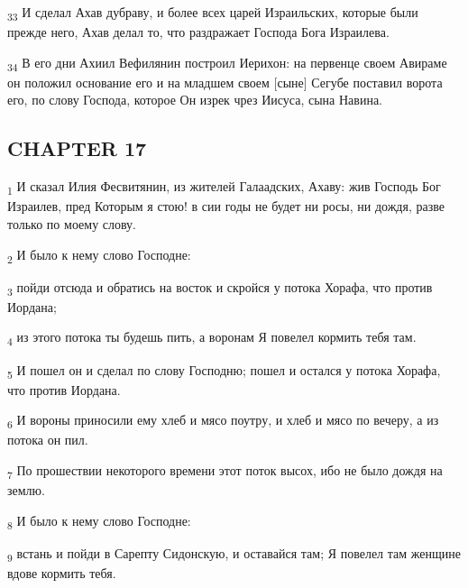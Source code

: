 \begin{tcolorbox}
\textsubscript{33} И сделал Ахав дубраву, и более всех царей Израильских, которые были прежде него, Ахав делал то, что раздражает Господа Бога Израилева.
\end{tcolorbox}
\begin{tcolorbox}
\textsubscript{34} В его дни Ахиил Вефилянин построил Иерихон: на первенце своем Авираме он положил основание его и на младшем своем [сыне] Сегубе поставил ворота его, по слову Господа, которое Он изрек чрез Иисуса, сына Навина.
\end{tcolorbox}
\subsection{CHAPTER 17}
\begin{tcolorbox}
\textsubscript{1} И сказал Илия Фесвитянин, из жителей Галаадских, Ахаву: жив Господь Бог Израилев, пред Которым я стою! в сии годы не будет ни росы, ни дождя, разве только по моему слову.
\end{tcolorbox}
\begin{tcolorbox}
\textsubscript{2} И было к нему слово Господне:
\end{tcolorbox}
\begin{tcolorbox}
\textsubscript{3} пойди отсюда и обратись на восток и скройся у потока Хорафа, что против Иордана;
\end{tcolorbox}
\begin{tcolorbox}
\textsubscript{4} из этого потока ты будешь пить, а воронам Я повелел кормить тебя там.
\end{tcolorbox}
\begin{tcolorbox}
\textsubscript{5} И пошел он и сделал по слову Господню; пошел и остался у потока Хорафа, что против Иордана.
\end{tcolorbox}
\begin{tcolorbox}
\textsubscript{6} И вороны приносили ему хлеб и мясо поутру, и хлеб и мясо по вечеру, а из потока он пил.
\end{tcolorbox}
\begin{tcolorbox}
\textsubscript{7} По прошествии некоторого времени этот поток высох, ибо не было дождя на землю.
\end{tcolorbox}
\begin{tcolorbox}
\textsubscript{8} И было к нему слово Господне:
\end{tcolorbox}
\begin{tcolorbox}
\textsubscript{9} встань и пойди в Сарепту Сидонскую, и оставайся там; Я повелел там женщине вдове кормить тебя.
\end{tcolorbox}
